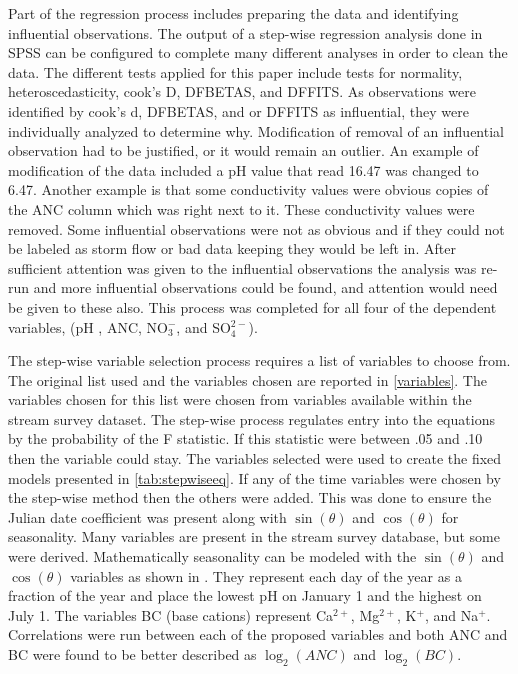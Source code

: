 Part of the regression process includes preparing the data and identifying influential observations. The output of a step-wise regression analysis done in SPSS can be configured to complete many different analyses in order to clean the data. The different tests applied for this paper include tests for normality, heteroscedasticity, cook's D, DFBETAS, and DFFITS. As observations were identified by cook's d, DFBETAS, and or DFFITS as influential, they were individually analyzed to determine why. Modification of removal of an influential observation had to be justified, or it would remain an outlier. An example of modification of the data included a pH value that read 16.47 was changed to 6.47. Another example is that some conductivity values were obvious copies of the ANC column which was right next to it. These conductivity values were removed. Some influential observations were not as obvious and if they could not be labeled as storm flow or bad data keeping they would be left in. After sufficient attention was given to the influential observations the analysis was re-run and more influential observations could be found, and attention would need be given to these also. This process was completed for all four of the dependent variables, (pH , ANC, NO$_3^-$, and SO$_4^{2-}$).
 
 The step-wise variable selection process requires a list of variables to choose from.  The original list used and the variables chosen are reported in \autoref{variables}.  The variables chosen for this list were chosen from variables available within the stream survey dataset.  The step-wise process regulates entry into the equations by the probability of the F statistic.  If this statistic were between .05 and .10 then the variable could stay.   The variables selected were used to create the fixed models presented in \autoref{tab:stepwiseeq}.  If any of the time variables were chosen by the step-wise method then the others were added.  This was done to ensure the Julian date coefficient was present along with $\sin(\theta)$ and $\cos(\theta)$ for seasonality.  Many variables are present in the stream survey database, but some were derived.  Mathematically seasonality can be modeled with the $\sin(\theta)$ and $\cos(\theta)$ variables as shown in \citet{helsel1992statistical}.  They represent each day of the year as a fraction of the year and place the lowest pH on January 1 and the highest on July 1.  The variables BC (base cations) represent Ca$^{2+}$, Mg$^{2+}$, K$^+$, and Na$^+$.  Correlations were run between each of the proposed variables  and both ANC and BC were found to be better described as $\log_2(ANC)$ and $\log_2(BC)$.
 
